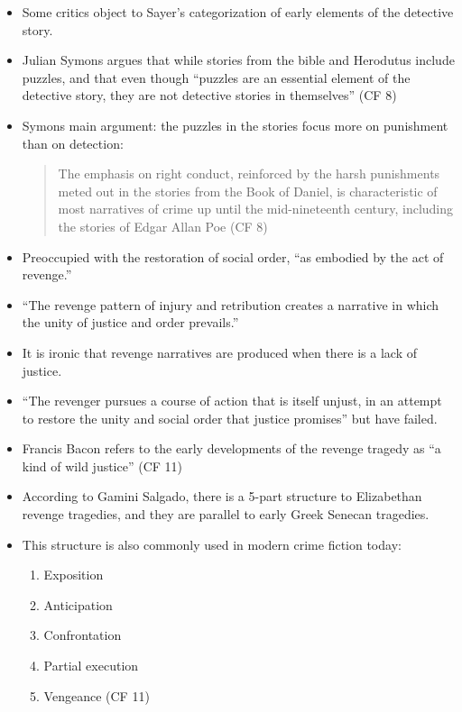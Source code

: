 \documentclass[a4paper,landscape,headrule,footrule,xetex]{foils}
\begin{document}
\begin{itemize}
  \item Some critics object to Sayer’s categorization of early elements of the detective story. 
  \item Julian Symons argues that while stories from the bible and
    Herodutus include puzzles, and that even though “puzzles are an
    essential element of the detective story, they are not detective
    stories in themselves” (CF 8)
  \item Symons main argument: the puzzles in the stories focus more on
    punishment than on detection:  
    \begin{quote}
      The emphasis on right conduct, reinforced by the harsh
      punishments meted out in the stories from the Book of Daniel, is
      characteristic of most narratives of crime up until the
      mid-nineteenth century, including the stories of Edgar Allan
      Poe \hfill (CF 8)
  \end{quote} 
\end{itemize}           
\begin{itemize}
\item   Preoccupied with the restoration of social order, “as
  embodied by the act of revenge.” 
\item    “The revenge pattern of injury and retribution creates a
  narrative in which the unity of justice and order prevails.” 
\item    It is ironic that revenge narratives are produced when there is a lack
  of justice. 
\item    “The revenger pursues a course of action that is
  itself unjust, in an attempt to restore the unity and social order
  that justice promises” but have failed.
\item     Francis Bacon refers to
  the early developments of the revenge tragedy as “a kind of wild
  justice” (CF 11)

\end{itemize}
\newpage
\begin{itemize}
\item According to Gamini Salgado, there is a 5-part structure to
  Elizabethan revenge tragedies, and they are parallel to early Greek
  Senecan tragedies.
\item  This structure is also commonly used in modern
  crime fiction today: 
  \begin{enumerate}
\item   Exposition     
\item  Anticipation      
\item  Confrontation 
\item  Partial execution 
\item  Vengeance (CF  11)
\end{enumerate}      
\end{itemize}
\end{document}
